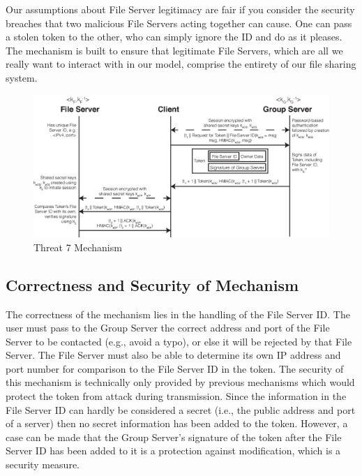 \documentclass[11pt]{article}
\begin{document}
Our assumptions about File Server legitimacy are fair if you consider the security breaches that two malicious File Servers acting together can cause. One can pass a stolen token to the other, who can simply ignore the ID and do as it pleases. The mechanism is built to ensure that legitimate File Servers, which are all we really want to interact with in our model, comprise the entirety of our file sharing system.
\begin{figure}[htbp]
\begin{center}
\includegraphics{threat7.eps}
\caption{Threat 7 Mechanism}
\label{threat7}
\end{center}
\end{figure}
\subsection{Correctness and Security of Mechanism}
The correctness of the mechanism lies in the handling of the File Server ID. The user must pass to the Group Server the correct address and port of the File Server to be contacted (e.g., avoid a typo), or else it will be rejected by that File Server. The File Server must also be able to determine its own IP address and port number for comparison to the File Server ID in the token.
	The security of this mechanism is technically only provided by previous mechanisms which would protect the token from attack during transmission. Since the information in the File Server ID can hardly be considered a secret (i.e., the public address and port of a server) then no secret information has been added to the token. However, a case can be made that the Group Server's signature of the token after the File Server ID has been added to it is a protection against modification, which is a security measure.
\end{document}
